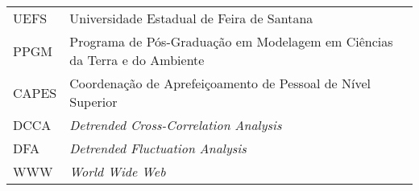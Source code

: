 \begin{thesisabbreviations}
\begin{footnotesize}
\begin{longtable}[l]{p{2cm}l}

    UEFS    \dotfill & Universidade Estadual de Feira de Santana \\
    PPGM    \dotfill & Programa de Pós-Graduação em Modelagem em Ciências da Terra e do Ambiente \\
    CAPES   \dotfill & Coordenação de Aprefeiçoamento de Pessoal de Nível Superior \\
    DCCA    \dotfill & \emph{Detrended Cross-Correlation Analysis} \\
    DFA     \dotfill & \emph{Detrended Fluctuation Analysis} \\
    WWW     \dotfill & \emph{World Wide Web} \\

\end{longtable}
\end{footnotesize}
\end{thesisabbreviations}
